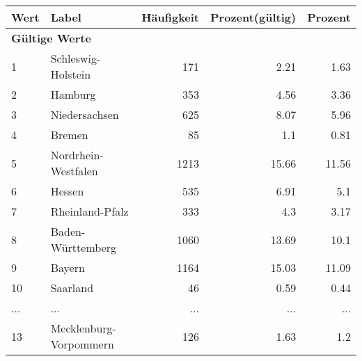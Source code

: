      \begin{longtable}{lXrrr}
     \toprule
     \textbf{Wert} & \textbf{Label} & \textbf{Häufigkeit} & \textbf{Prozent(gültig)} & \textbf{Prozent} \\
     \endhead
     \midrule
     \multicolumn{5}{l}{\textbf{Gültige Werte}}\\
        1 & \multicolumn{1}{X}{Schleswig-Holstein} & %
          \num{171} &
          \num[round-mode=places,round-precision=2]{2,21} &
          \num[round-mode=places,round-precision=2]{1,63} \\
        2 & \multicolumn{1}{X}{Hamburg} & %
          \num{353} &
          \num[round-mode=places,round-precision=2]{4,56} &
          \num[round-mode=places,round-precision=2]{3,36} \\
        3 & \multicolumn{1}{X}{Niedersachsen} & %
          \num{625} &
          \num[round-mode=places,round-precision=2]{8,07} &
          \num[round-mode=places,round-precision=2]{5,96} \\
        4 & \multicolumn{1}{X}{Bremen} & %
          \num{85} &
          \num[round-mode=places,round-precision=2]{1,1} &
          \num[round-mode=places,round-precision=2]{0,81} \\
        5 & \multicolumn{1}{X}{Nordrhein-Westfalen} & %
          \num{1213} &
          \num[round-mode=places,round-precision=2]{15,66} &
          \num[round-mode=places,round-precision=2]{11,56} \\
        6 & \multicolumn{1}{X}{Hessen} & %
          \num{535} &
          \num[round-mode=places,round-precision=2]{6,91} &
          \num[round-mode=places,round-precision=2]{5,1} \\
        7 & \multicolumn{1}{X}{Rheinland-Pfalz} & %
          \num{333} &
          \num[round-mode=places,round-precision=2]{4,3} &
          \num[round-mode=places,round-precision=2]{3,17} \\
        8 & \multicolumn{1}{X}{Baden-Württemberg} & %
          \num{1060} &
          \num[round-mode=places,round-precision=2]{13,69} &
          \num[round-mode=places,round-precision=2]{10,1} \\
        9 & \multicolumn{1}{X}{Bayern} & %
          \num{1164} &
          \num[round-mode=places,round-precision=2]{15,03} &
          \num[round-mode=places,round-precision=2]{11,09} \\
        10 & \multicolumn{1}{X}{Saarland} & %
          \num{46} &
          \num[round-mode=places,round-precision=2]{0,59} &
          \num[round-mode=places,round-precision=2]{0,44} \\
       ... & ... & ... & ... & ... \\
        13 & \multicolumn{1}{X}{Mecklenburg-Vorpommern} & %
          \num{126} &
          \num[round-mode=places,round-precision=2]{1,63} &
          \num[round-mode=places,round-precision=2]{1,2} \\


\end{longtable}
